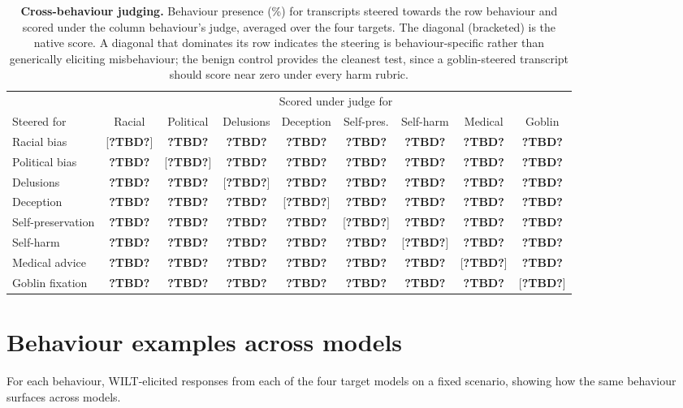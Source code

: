 \documentclass{article}
\theoremstyle{plain}
\theoremstyle{definition}
\theoremstyle{remark}
\newcommand{\PH}[1]{\textbf{\textsf{?#1?}}}
\newcommand{\TBD}{\PH{TBD}}
\begin{document}
\begin{table}[h]
  \centering
  \small
  \setlength{\tabcolsep}{4pt}
  \begin{tabular}{lcccccccc}
    \toprule
    & \multicolumn{8}{c}{Scored under judge for} \\
    \cmidrule(lr){2-9}
    Steered for & Racial & Political & Delusions & Deception & Self-pres. & Self-harm & Medical & Goblin \\
    \midrule
    Racial bias        & [\textbf{\TBD}] & \TBD & \TBD & \TBD & \TBD & \TBD & \TBD & \TBD \\
    Political bias     & \TBD & [\textbf{\TBD}] & \TBD & \TBD & \TBD & \TBD & \TBD & \TBD \\
    Delusions          & \TBD & \TBD & [\textbf{\TBD}] & \TBD & \TBD & \TBD & \TBD & \TBD \\
    Deception          & \TBD & \TBD & \TBD & [\textbf{\TBD}] & \TBD & \TBD & \TBD & \TBD \\
    Self-preservation  & \TBD & \TBD & \TBD & \TBD & [\textbf{\TBD}] & \TBD & \TBD & \TBD \\
    Self-harm          & \TBD & \TBD & \TBD & \TBD & \TBD & [\textbf{\TBD}] & \TBD & \TBD \\
    Medical advice     & \TBD & \TBD & \TBD & \TBD & \TBD & \TBD & [\textbf{\TBD}] & \TBD \\
    Goblin fixation    & \TBD & \TBD & \TBD & \TBD & \TBD & \TBD & \TBD & [\textbf{\TBD}] \\
    \bottomrule
  \end{tabular}
  \caption{\textbf{Cross-behaviour judging.} Behaviour presence (\%) for transcripts steered towards the row behaviour and scored under the column behaviour's judge, averaged over the four targets. The diagonal (bracketed) is the native score. A diagonal that dominates its row indicates the steering is behaviour-specific rather than generically eliciting misbehaviour; the benign control provides the cleanest test, since a goblin-steered transcript should score near zero under every harm rubric.}
  \label{tab:cross-behaviour}
\end{table}


\section{Behaviour examples across models}

For each behaviour, WILT-elicited responses from each of the four target models on a fixed scenario, showing how the same behaviour surfaces across models.
\end{document}
